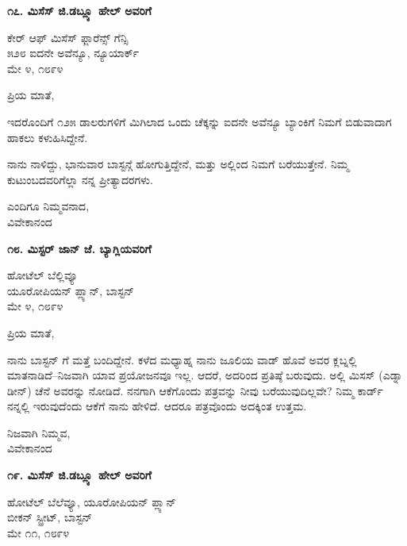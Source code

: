 \begin{center}
\textbf{೧೭. ಮಿಸೆಸ್ ಜಿ.ಡಬ್ಲ್ಯೂ ಹೇಲ್ ಅವರಿಗೆ}
\end{center}

\begin{flushright}
ಕೇರ್ ಆಫ್ ಮಿಸೆಸ್ ಫ್ಲಾರೆನ್ಸ್ ಗೆನ್ಸಿ\\೫೨೮ ಐದನೇ ಅವೆನ್ಯೂ, ನ್ಯೂಯಾರ್ಕ್\\ಮೇ ೪, ೧೮೯೪
\end{flushright}

ಪ್ರಿಯ ಮಾತೆ,

ಇದರೊಂದಿಗೆ ೧೨೫ ಡಾಲರುಗಳಿಗೆ ಮಿಗಿಲಾದ ಒಂದು ಚೆಕ್ಕನ್ನು ಐದನೇ ಅವೆನ್ಯೂ ಬ್ಯಾಂಕಿಗೆ ನಿಮಗೆ ಬಿಡುವಾದಾಗ ಹಾಕಲು ಕಳುಹಿಸಿದ್ದೇನೆ.

ನಾನು ನಾಳಿದ್ದು, ಭಾನುವಾರ ಬಾಸ್ಟನ್ಗೆ ಹೋಗುತ್ತಿದ್ದೇನೆ, ಮತ್ತು ಅಲ್ಲಿಂದ ನಿಮಗೆ ಬರೆಯುತ್ತೇನೆ. ನಿಮ್ಮ ಕುಟುಂಬದವರಿಗೆಲ್ಲಾ ನನ್ನ ಪ್ರೀತ್ಯಾದರಗಳು.

\begin{flushright}
ಎಂದಿಗೂ ನಿಮ್ಮವನಾದ,\\ವಿವೇಕಾನಂದ
\end{flushright}

\begin{center}
\textbf{೧೮. ಮಿಸ್ಟರ್ ಜಾನ್ ಜೆ. ಬ್ಯಾಗ್ಲಿಯವರಿಗೆ}
\end{center}

\begin{flushright}
ಹೋಟೆಲ್ ಬೆಲ್ಲಿವ್ಯೂ\\ಯೂರೋಪಿಯನ್ ಪ್ಲ್ಯಾನ್, ಬಾಸ್ಟನ್\\ಮೇ ೪, ೧೮೯೪
\end{flushright}

ಪ್ರಿಯ ಮಾತೆ,

ನಾನು ಬಾಸ್ಟನ್ ಗೆ ಮತ್ತೆ ಬಂದಿದ್ದೇನೆ. ಕಳೆದ ಮಧ್ಯಾಹ್ನ ನಾನು ಜೂಲಿಯ ವಾಡ್ ಹೊವೆ ಅವರ ಕ್ಲಬ್ನಲ್ಲಿ ಮಾತನಾಡಿದೆ–ನಿಜವಾಗಿ ಯಾವ ಪ್ರಯೋಜನವೂ ಇಲ್ಲ. ಆದರೆ, ಅದರಿಂದ ಪ್ರತಿಷ್ಠೆ ಬರುವುದು. ಅಲ್ಲಿ ಮಿಸಸ್ (ಎಡ್ನಾ ಡೀನ್) ಚೆನೆ ಅವರನ್ನು ನೋಡಿದೆ. ನನಗಾಗಿ ಆಕೆಗೊಂದು ಪತ್ರವನ್ನು ನೀವು ಬರೆಯುವುದಿಲ್ಲವೇ? ನಿಮ್ಮ ಕಾರ್ಡ್ ನನ್ನಲ್ಲಿ ಇರುವುದೆಂದು ಆಕೆಗೆ ನಾನು ಹೇಳಿದೆ. ಆದರೂ ಪತ್ರವೊಂದು ಅದಕ್ಕಿಂತ ಉತ್ತಮ.

\begin{flushright}
ನಿಜವಾಗಿ ನಿಮ್ಮವ,\\ವಿವೇಕಾನಂದ
\end{flushright}

\begin{center}
\textbf{೧೯. ಮಿಸೆಸ್ ಜಿ.ಡಬ್ಲ್ಯೂ ಹೇಲ್ ಅವರಿಗೆ}
\end{center}

\begin{flushright}
ಹೋಟೆಲ್ ಬೆಲೆವ್ಯೂ, ಯೂರೋಪಿಯನ್ ಪ್ಲ್ಯಾನ್\\ಬೀಕನ್ ಸ್ಟ್ರೀಟ್, ಬಾಸ್ಟನ್\\ಮೇ ೧೧, ೧೮೯೪
\end{flushright}

